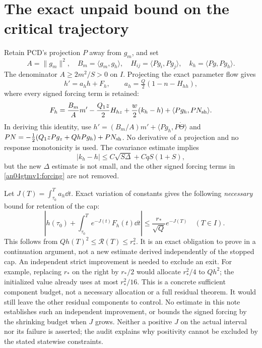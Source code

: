 \documentclass[11pt]{article}
\begin{document}
\section{The exact unpaid bound on the critical trajectory}
Retain PCD's projection $P$ away from $g_m$, and set
\[
 A=\|g_m\|^2,\quad B_m=\langle g_m,g_h\rangle,\quad
 H_{ij}=\langle Pg_i,Pg_j\rangle,\quad
 k_h=\langle Pg,Pg_h\rangle.
\]
The denominator $A\ge2m^2/S>0$ on $I$.
Projecting the exact parameter flow gives
\begin{equation}\label{an04gtmv1:hexact}
 h'=a_hh+F_h,\qquad a_h=\tfrac Q2(1-n-H_{hh}),
\end{equation}
where every signed forcing term is retained:
\begin{equation}\label{an04gtmv1:forcing}
 F_h=\frac{B_m}{A}m'-\frac{Q_1z}{2}H_{hz}
        +\frac w2(k_h-h)+\langle Pg_h,PN_{\rm sh}\rangle.
\end{equation}
In deriving this identity, use
$h'=(B_m/A)m'+\langle Pg_h,P\dot\Theta\rangle$ and
$PN=-\tfrac12(Q_1zPg_z+QhPg_h)+PN_{\rm sh}$.
No derivative of a projection and no response monotonicity is used.
The covariance estimate implies
\[
 |k_h-h|\le C\sqrt{S\Delta}+CqS(1+S),
\]
but the new $\Delta$ estimate is not small, and the other signed
forcing terms in \eqref{an04gtmv1:forcing} are not removed.

Let $J(T)=\int_{\tau_0}^Ta_h\dd t$. Exact variation of constants
gives the following \emph{necessary} bound for retention of the cap:
\begin{equation}\label{an04gtmv1:unpaid}
 \boxed{\quad
 \left|h(\tau_0)+\int_{\tau_0}^Te^{-J(t)}F_h(t)\dd t\right|
       \le\frac{r_*}{\sqrt Q}e^{-J(T)}\quad(T\in I).
 }
\end{equation}
This follows from $Qh(T)^2\le\mathcal R(T)\le r_*^2$.
It is an exact obligation to prove in a continuation argument,
not a new estimate derived independently of the stopped cap.
An independent strict improvement is needed to exclude an exit.
For example, replacing $r_*$ on the right by $r_*/2$ would
allocate $r_*^2/4$ to $Qh^2$; the initialized value already
uses at most $r_*^2/16$. This is a concrete sufficient component
budget, not a necessary allocation or a full residual theorem.
It would still leave the other residual components to control.
No estimate in this note establishes such an independent improvement,
or bounds the signed forcing by the shrinking budget when $J$ grows.
Neither a positive $J$ on the actual interval nor its failure is
asserted; the audit explains why positivity cannot be excluded
by the stated statewise constraints.
\end{document}
